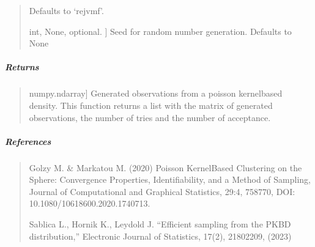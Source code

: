 \documentclass[letterpaper,10pt,english,openany,oneside]{sphinxmanual}
\begin{document}
\begin{fulllineitems}
\begin{quote}
\begin{description}
\sphinxAtStartPar
Defaults to ‘rejvmf’.

\sphinxlineitem{random\_state}{[}int, None, optional. {]}
\sphinxAtStartPar
Seed for random number generation. Defaults to None

\end{description}
\end{quote}


\subparagraph{Returns}
\label{\detokenize{api_reference/generated/QuadratiK.spherical_clustering.PKBD:id2}}\begin{quote}
\begin{description}
\sphinxlineitem{samples}{[}numpy.ndarray{]}
\sphinxAtStartPar
Generated observations from a poisson kernel\sphinxhyphen{}based density.
This function returns a list with the matrix of generated observations, the 
number of tries and the number of acceptance.

\end{description}
\end{quote}


\subparagraph{References}
\label{\detokenize{api_reference/generated/QuadratiK.spherical_clustering.PKBD:references}}\begin{quote}

\sphinxAtStartPar
Golzy M. \& Markatou M. (2020) Poisson Kernel\sphinxhyphen{}Based 
Clustering on the Sphere: Convergence Properties, Identifiability, 
and a Method of Sampling, Journal of Computational and Graphical Statistics, 
29:4, 758\sphinxhyphen{}770, DOI: 10.1080/10618600.2020.1740713.

\sphinxAtStartPar
Sablica L., Hornik K., Leydold J. “Efficient sampling from the PKBD 
distribution,” Electronic Journal of Statistics, 17(2), 2180\sphinxhyphen{}2209, (2023)
\end{quote}



\end{fulllineitems}
\end{document}
